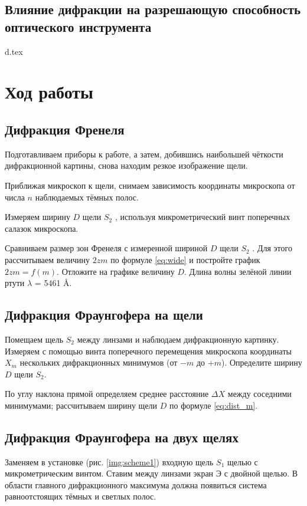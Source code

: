 \documentclass[a5paper,10pt, twoside]{article} %
\begin{document}
\subsection{Влияние дифракции на разрешающую способность оптического инструмента}
    {d.tex}

\section{Ход работы}

\subsection{Дифракция Френеля}

Подготавливаем приборы к работе, а затем, добившись наибольшей чёткости дифракционной картины, снова 
находим резкое изображение щели.

Приближая микроскоп к щели, снимаем зависимость координаты микроскопа от числа $n$ наблюдаемых тёмных 
полос.

Измеряем ширину $D$ щели $S_2$ , используя микрометрический винт поперечных салазок микроскопа.

Сравниваем размер зон Френеля с измеренной шириной $D$ щели $S_2$ . Для этого рассчитываем величину
$2 z m$ по формуле \eqref{eq:wide} 
и постройте график $2 z m = f(m)$. Отложите на графике величину $D$.
Длина волны зелёной линии ртути $\lambda$ = 5461 \AA.

\subsection{Дифракция Фраунгофера на щели}

Помещаем щель $S_2$ между линзами и наблюдаем дифракционную картинку. Измеряем с помощью винта 
поперечного перемещения микроскопа координаты $X_m$ нескольких дифракционных минимумов 
(от $-m$ до $+m$). Определите ширину $D$ щели $S_2$.

По углу наклона прямой определяем среднее расстояние $\Delta X$ между соседними минимумами;
рассчитываем ширину щели $D$ по формуле \eqref{eq:dist_m}.

\subsection{Дифракция Фраунгофера на двух щелях}

Заменяем в установке (рис. \ref{img:scheme1}) входную щель $S_1$ щелью с микрометрическим винтом.
Ставим между линзами экран Э с двойной щелью. В области главного дифракционного максимума должна 
появиться система равноотстоящих тёмных и светлых полос.
\end{document}
